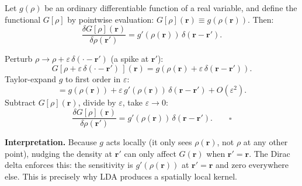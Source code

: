 \documentclass[12pt,letterpaper]{article}
\theoremstyle{definition}
\begin{document}
\begin{keyresult}[title={Composite Chain Rule for Local Functionals}]
Let $g(\rho)$ be an ordinary differentiable function of a real variable, and
define the functional $G[\rho]$ by pointwise evaluation:
$G[\rho](\bm{r}) \equiv g\!\left(\rho(\bm{r})\right)$.
Then:
\begin{equation}
  \frac{\delta G[\rho](\bm{r})}{\delta\rho(\bm{r}')}
  = g'\!\left(\rho(\bm{r})\right)\,\delta(\bm{r}-\bm{r}').
  \label{eq:chain_rule_local}
\end{equation}
\begin{derivbox}[title={Proof}]
Perturb $\rho \to \rho + \varepsilon\,\delta(\cdot - \bm{r}')$ (a spike at $\bm{r}'$):
\begin{equation}
  G[\rho + \varepsilon\,\delta(\cdot-\bm{r}')\,](\bm{r})
  = g\!\left(\rho(\bm{r}) + \varepsilon\,\delta(\bm{r}-\bm{r}')\right).
\end{equation}
Taylor-expand $g$ to first order in $\varepsilon$:
\begin{equation}
  = g\!\left(\rho(\bm{r})\right)
    + \varepsilon\,g'\!\left(\rho(\bm{r})\right)\,\delta(\bm{r}-\bm{r}')
    + O(\varepsilon^2).
\end{equation}
Subtract $G[\rho](\bm{r})$, divide by $\varepsilon$, take $\varepsilon\to 0$:
\begin{equation}
  \frac{\delta G[\rho](\bm{r})}{\delta\rho(\bm{r}')}
  = g'\!\left(\rho(\bm{r})\right)\,\delta(\bm{r}-\bm{r}'). \qquad\square
\end{equation}
\end{derivbox}
\noindent\textbf{Interpretation.}
Because $g$ acts locally (it only sees $\rho(\bm{r})$, not $\rho$ at any other
point), nudging the density at $\bm{r}'$ can only affect $G(\bm{r})$ when
$\bm{r}' = \bm{r}$.  The Dirac delta enforces this: the sensitivity is
$g'(\rho(\bm{r}))$ at $\bm{r}' = \bm{r}$ and zero everywhere else.
This is precisely why LDA produces a spatially local kernel.
\end{keyresult}
\end{document}
